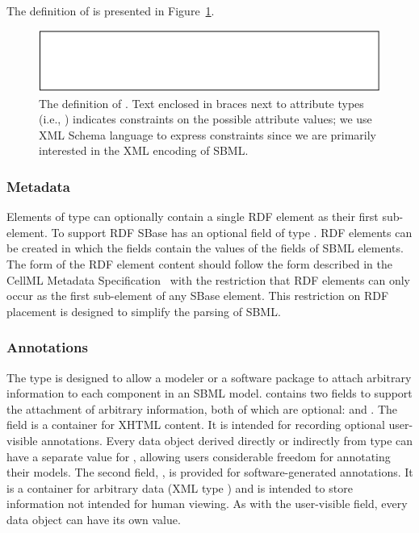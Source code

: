 \documentclass[10pt]{cekarticle}
\newcommand{\vref}[1]{\ref{#1}}
\begin{document}
The definition of  is presented in
Figure~\vref{fig:identified}.

\begin{figure}[h]
  \centering
  \includegraphics[scale = 0.68]{identified}
  \caption{The definition of .  Text enclosed in braces next
    to attribute types (i.e., ) indicates
    constraints on the possible attribute values; we use XML Schema
    language to express constraints since we are primarily interested in
    the XML encoding of SBML.}
  \label{fig:identified}
\end{figure}

\subsubsection{Metadata}
\label{sec:metadata}

Elements of type  can optionally contain a single RDF
 element as their first sub-element.  To support RDF
SBase has an optional field  of type .
RDF  elements can be created in which the
 fields contain the values of the
 fields of SBML elements. The form of the RDF
element content should follow the form described in the CellML
Metadata Specification~\citep{cuellar:2002} with the restriction
that RDF elements can only occur as the first sub-element of any
SBase element. This restriction on RDF placement is designed to
simplify the parsing of SBML.

\subsubsection{Annotations}

The type  is designed to allow a modeler or a
software package to attach arbitrary information to each component
in an SBML model.   contains two fields to support
the attachment of arbitrary information, both of which are
optional:  and . The field
 is a container for XHTML content.  It is intended
for recording optional user-visible annotations.  Every data
object derived directly or indirectly from type  can
have a separate value for , allowing users
considerable freedom for annotating their models.  The second
field, , is provided for software-generated
annotations.  It is a container for arbitrary data (XML type
) and is intended to store information not intended for
human viewing.  As with the user-visible  field,
every data object can have its own  value.
\end{document}
